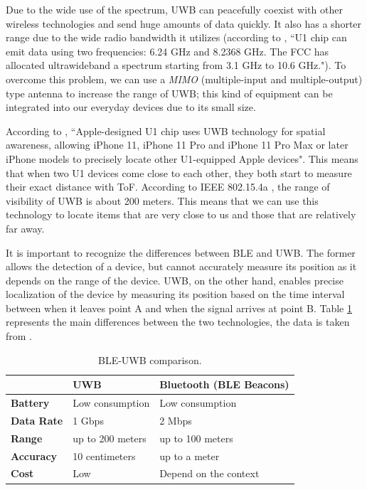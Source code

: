 \documentclass[english]{article}
\begin{document}
Due to the wide use of the spectrum, UWB can peacefully coexist with other wireless technologies and send huge amounts of data quickly. It also has a shorter range due to the wide radio bandwidth it utilizes (according to \cite{Zafar2019}, ``U1 chip can emit data using two frequencies: 6.24 GHz and 8.2368 GHz. The FCC has allocated ultrawideband a spectrum starting from 3.1 GHz to 10.6 GHz."). To overcome this problem, we can use a \textit{MIMO} (multiple-input and multiple-output) type antenna to increase the range of UWB; this kind of equipment can be integrated into our everyday devices due to its small size.

According to \cite{aps}, ``Apple-designed U1 chip uses UWB technology for spatial awareness, allowing iPhone 11, iPhone 11 Pro and iPhone 11 Pro Max or later iPhone models to precisely locate other U1-equipped Apple devices". This means that when two U1 devices come close to each other, they both start to measure their exact distance with ToF. According to IEEE 802.15.4a \cite{5394030}, the range of visibility of UWB is about 200 meters. This means that we can use this technology to locate items that are very close to us and those that are relatively far away.

It is important to recognize the differences between BLE and UWB. The former allows the detection of a device, but cannot accurately measure its position as it depends on the range of the device. UWB, on the other hand, enables precise localization of the device by measuring its position based on the time interval between when it leaves point A and when the signal arrives at point B.
Table \ref{tableu} represents the main differences between the two technologies, the data is taken from \cite{encstore}.
\begin{table}[h] 
\caption{BLE-UWB comparison.}
  \centering
  
    \begin{tabular}{l|l|l|}
      \cline{2-3}
      {}                               & {\textbf{UWB}}                & { \textbf{Bluetooth (BLE Beacons)}} \\ \hline
      \multicolumn{1}{|l|}{{  \textbf{Battery}}}  & {  Low consumption}             & {  Low consumption}                  \\ \hline
      \multicolumn{1}{|l|}{{  \textbf{Data Rate}}}  & { 1 Gbps }             & { 2 Mbps }                  \\ \hline
      \multicolumn{1}{|l|}{{  \textbf{Range}}}    & {  up to 200 meters} & {  up to 100 meters}       \\ \hline
      \multicolumn{1}{|l|}{{  \textbf{Accuracy}}} & {  10 centimeters} & {  up to a meter}                    \\ \hline
      \multicolumn{1}{|l|}{{  \textbf{Cost}}}     & {  Low}                         & {Depend on the context }                              \\ \hline
    \end{tabular}
    \label{tableu}
  \end{table}
\end{document}
